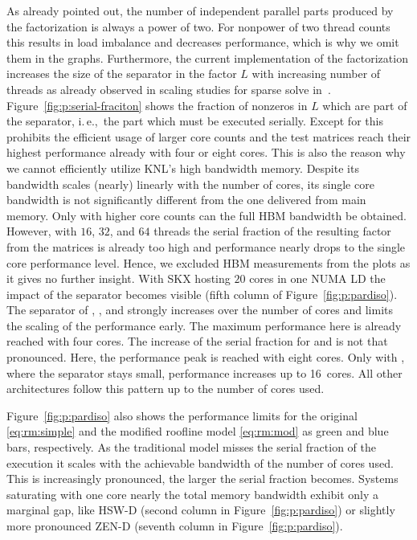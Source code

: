 As already pointed out, the number of independent parallel parts produced by the
factorization is always a power of two.
For nonpower of two thread counts this results in load imbalance and decreases
performance, which is why we omit them in the graphs.
%
Furthermore, the current implementation of the factorization increases the size
of the separator in the factor $L$ with increasing number of threads as already
observed in scaling studies for sparse solve in~\cite{klawonn-2015}.
%
Figure~\ref{fig:p:serial-fraciton} shows the fraction of nonzeros in $L$ which are
part of the separator, i.\,e.,\ the part which must be executed serially.
Except for  this prohibits the efficient usage of larger core
counts and the test matrices reach their highest performance already with four
or eight cores.
%
This is also the reason why we cannot efficiently utilize KNL's high bandwidth
memory.
Despite its bandwidth scales (nearly) linearly with the number of cores, its
single core bandwidth is not significantly different from the one delivered from
main memory.
Only with higher core counts can the full HBM bandwidth be obtained.
However, with $16$, $32$, and $64$ threads the serial fraction of the resulting
factor from the matrices is already too high and performance nearly drops to
the single core performance level.
Hence, we excluded HBM measurements from the plots as it gives no further
insight.
%
With SKX hosting $20$ cores in one NUMA LD the impact of the separator becomes
visible (fifth column of Figure~\ref{fig:p:pardiso}).
The separator of , , and \/ strongly increases 
over the number of cores and limits the scaling of the performance early.
The maximum performance here is already reached with four cores.
The increase of the serial fraction for  and  is not
that pronounced.
Here, the performance peak is reached with eight cores.
Only with , where the separator stays small, performance increases
up to 16~cores.
All other architectures follow this pattern up to the number of cores used.

Figure~\ref{fig:p:pardiso} also shows the performance limits for the original
\eqref{eq:rm:simple} and the modified roofline model \eqref{eq:rm:mod}
as green and blue bars, respectively.
As the traditional model misses the serial fraction of the execution it scales
with the achievable bandwidth of the number of cores used.
This is increasingly pronounced, the larger the serial fraction becomes. 
%
Systems saturating with one core nearly the total memory bandwidth exhibit
only a marginal gap, like HSW-D (second column in Figure~\ref{fig:p:pardiso}) or
slightly more pronounced ZEN-D (seventh column in Figure~\ref{fig:p:pardiso}).

